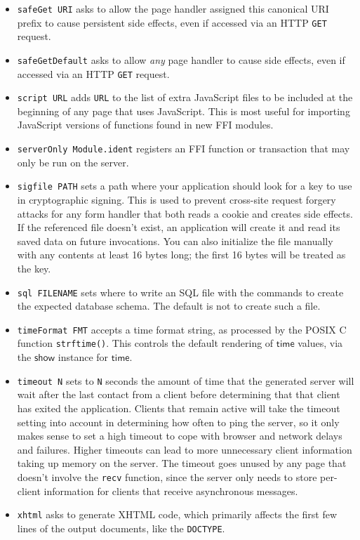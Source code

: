 \documentclass{article}
\newcommand{\cd}[1]{\texttt{#1}}
\newcommand{\mt}[1]{\mathsf{#1}}
\begin{document}
\begin{itemize}
\item \texttt{safeGet URI} asks to allow the page handler assigned this canonical URI prefix to cause persistent side effects, even if accessed via an HTTP \cd{GET} request.
\item \texttt{safeGetDefault} asks to allow \emph{any} page handler to cause side effects, even if accessed via an HTTP \cd{GET} request.
\item \texttt{script URL} adds \texttt{URL} to the list of extra JavaScript files to be included at the beginning of any page that uses JavaScript.  This is most useful for importing JavaScript versions of functions found in new FFI modules.
\item \texttt{serverOnly Module.ident} registers an FFI function or transaction that may only be run on the server.
\item \texttt{sigfile PATH} sets a path where your application should look for a key to use in cryptographic signing.  This is used to prevent cross-site request forgery attacks for any form handler that both reads a cookie and creates side effects.  If the referenced file doesn't exist, an application will create it and read its saved data on future invocations.  You can also initialize the file manually with any contents at least 16 bytes long; the first 16 bytes will be treated as the key.
\item \texttt{sql FILENAME} sets where to write an SQL file with the commands to create the expected database schema.  The default is not to create such a file.
\item \texttt{timeFormat FMT} accepts a time format string, as processed by the POSIX C function \texttt{strftime()}.  This controls the default rendering of $\mt{time}$ values, via the $\mt{show}$ instance for $\mt{time}$.
\item \texttt{timeout N} sets to \texttt{N} seconds the amount of time that the generated server will wait after the last contact from a client before determining that that client has exited the application.  Clients that remain active will take the timeout setting into account in determining how often to ping the server, so it only makes sense to set a high timeout to cope with browser and network delays and failures.  Higher timeouts can lead to more unnecessary client information taking up memory on the server.  The timeout goes unused by any page that doesn't involve the \texttt{recv} function, since the server only needs to store per-client information for clients that receive asynchronous messages.
\item \texttt{xhtml} asks to generate XHTML code, which primarily affects the first few lines of the output documents, like the \texttt{DOCTYPE}.
\end{itemize}
\end{document}
